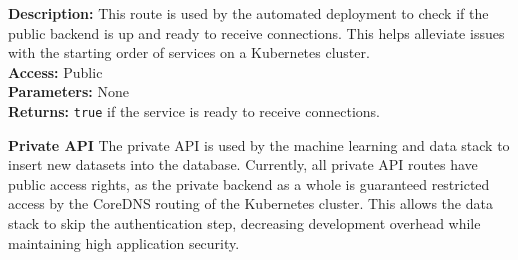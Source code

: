 \begin{itemize}
{\begin{itemize}
{        \textbf{Description:} This route is used by the automated deployment to
        check if the public backend is up and ready to receive connections. This
        helps alleviate issues with the starting order of services on a
        Kubernetes cluster.\\
        \textbf{Access:} Public\\
        \textbf{Parameters:} None\\
        \textbf{Returns:} \texttt{true} if the service is ready to receive
        connections.\\
    }
    \end{itemize}
  }

\end{itemize}

\textbf{Private API}
The private API is used by the machine learning and data stack to insert new
datasets into the database. Currently, all private API routes have public access
rights, as the private backend as a whole is guaranteed restricted access by the
CoreDNS routing of the Kubernetes cluster. This allows the data stack to skip
the authentication step, decreasing development overhead while maintaining high
application security.

